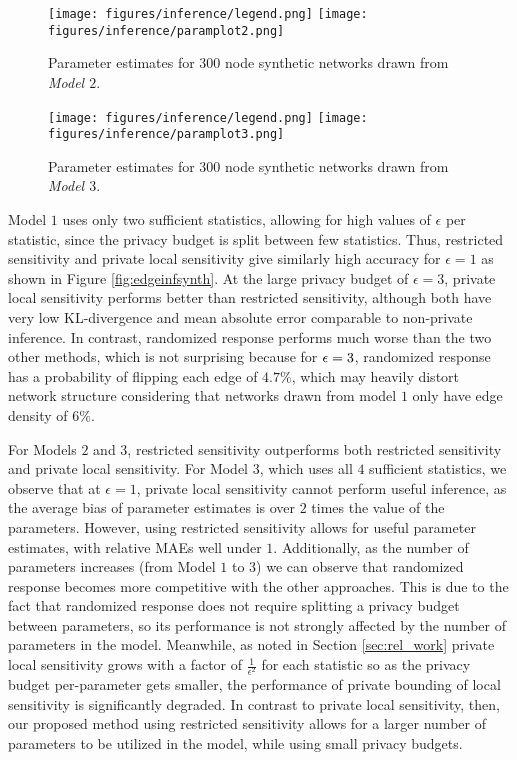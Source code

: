   \begin{figure}[h]
	\caption{Parameter estimates for $300$ node synthetic networks drawn from \emph{Model $\mathit{2}$}.}
	\centering 
	\texttt{[image: figures/inference/legend.png]}
	\texttt{[image: figures/inference/paramplot2.png]}
	\label{fig:edgeinfsynth2}
\end{figure}
 
  \begin{figure}[h]
	\caption{Parameter estimates for $300$ node synthetic networks drawn from \emph{Model $\mathit{3}$}.}
	\centering 
	\texttt{[image: figures/inference/legend.png]}
	\texttt{[image: figures/inference/paramplot3.png]}
	\label{fig:edgeinfsynth3}
\end{figure}

Model $1$ uses only two sufficient statistics, allowing for high values of $\epsilon$ per statistic, since the privacy budget is split between few statistics. Thus, restricted sensitivity and private local sensitivity give similarly high accuracy for $\epsilon=1$ as shown in Figure \ref{fig:edgeinfsynth}. At the large privacy budget of $\epsilon=3$, private local sensitivity performs better than restricted sensitivity, although both have very low KL-divergence and mean absolute error comparable to non-private inference. In contrast, randomized response performs much worse than the two other methods, which is not surprising because for $\epsilon = 3$, randomized response has a probability of flipping each edge of $4.7\%$, which may heavily distort network structure considering that networks drawn from model $1$ only have edge density of $6\%$.

For Models $2$ and $3$, restricted sensitivity outperforms both restricted sensitivity and private local sensitivity. For Model $3$, which uses all $4$ sufficient statistics, we observe that at $\epsilon=1$, private local sensitivity cannot perform useful inference, as the average bias of parameter estimates is over $2$ times the value of the parameters. However, using restricted sensitivity allows for useful parameter estimates, with relative MAEs well under $1$. Additionally, as the number of parameters increases (from Model $1$ to $3$) we can observe that randomized response becomes more competitive with the other approaches. This is due to the fact that randomized response does not require splitting a privacy budget between parameters, so its performance is not strongly affected by the number of parameters in the model. Meanwhile, as noted in Section \ref{sec:rel_work} private local sensitivity grows with a factor of $\frac{1}{\epsilon^2}$ for each statistic so as the privacy budget per-parameter gets smaller, the performance of private bounding of local sensitivity is significantly degraded. In contrast to private local sensitivity, then, our proposed method using restricted sensitivity allows for a larger number of parameters to be utilized in the model, while using small privacy budgets.

